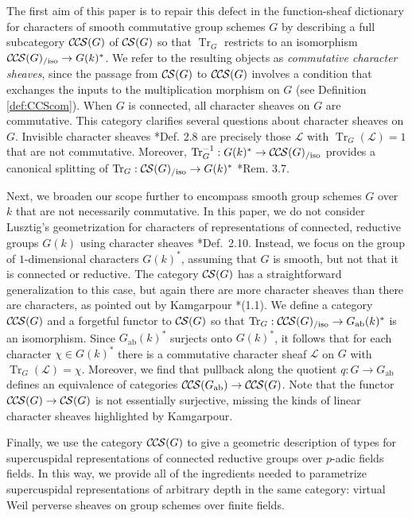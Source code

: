 \documentclass[10pt]{amsart}
\theoremstyle{plain}
\theoremstyle{definition}
\newcommand{\Fq}{k}
\newcommand{\ab}{_{\operatorname{ab}}}
\newcommand{\TrFrob}[1]{\operatorname{Tr}_{#1}}
\newcommand{\cs}[1]{{\mathcal{#1}}}
\newcommand{\CS}{{\mathcal{C\hskip-0.8pt S}}}
\newcommand{\CCS}{{\mathcal{C\hskip-.8pt C\hskip-0.8pt S}}}
\newcommand{\CSiso}[1]{\CS(#1)_{/\text{iso}}}
\newcommand{\CCSiso}[1]{\CCS(#1)_{/\text{iso}}}
\begin{document}
The first aim of this paper is to repair this defect in the function-sheaf dictionary for characters of smooth commutative group schemes $G$ by describing a full subcategory $\CCS(G)$ of $\CS(G)$ so that $\TrFrob{G}$ restricts to an isomorphism $\CCSiso{G} \to G(k)^*$.
We refer to the resulting objects as \emph{commutative character sheaves}, since the passage from $\CS(G)$ to $\CCS(G)$ involves a condition that exchanges the inputs to the multiplication morphism on $G$ (see Definition \ref{def:CCScom}).  
When $G$ is connected, all character sheaves on $G$ are commutative.
This category clarifies several questions about character sheaves on $G$.  Invisible character sheaves \cite{cunningham-roe:13a}*{Def. 2.8} are precisely those $\cs{L}$ with $\TrFrob{G}(\cs{L}) = 1$ that are not commutative.  Moreover, $\TrFrob{G}^{-1} : G(k)^* \to \CCSiso{G}$ provides a canonical splitting of $\TrFrob{G} : \CSiso{G} \to G(k)^*$ \cite{cunningham-roe:13a}*{Rem. 3.7}.

Next, we broaden our scope further to encompass smooth group schemes $G$ over $\Fq$ that are not necessarily commutative.
In this paper, we do not consider Lusztig's geometrization for characters of representations of connected, reductive groups $G(k)$
using character sheaves \cite{lusztig:85a}*{Def.~2.10}.  Instead, we focus on the group of $1$-dimensional characters
$G(k)^*$, assuming that $G$ is smooth, but not that it is connected or reductive.
The category $\CS(G)$ has a straightforward generalization to this case, but again
there are more character sheaves than there are characters, as pointed out by Kamgarpour \cite{kamgarpour:09a}*{(1.1)}.
We define a category $\CCS(G)$ and a forgetful functor to $\CS(G)$ so that $\TrFrob{G} : \CCSiso{G} \to G\ab(k)^*$
is an isomorphism.  
Since $G\ab(k)^*$ surjects onto $G(k)^*$, it follows that for each character $\chi \in G(k)^*$ there is a commutative
character sheaf $\cs{L}$ on $G$ with $\TrFrob{G}(\cs{L}) = \chi$. Moreover, we find that pullback along the quotient $q : G \to G\ab$
defines an equivalence of categories $\CCS(G\ab) \to \CCS(G)$.  Note that the functor $\CCS(G) \to \CS(G)$ is not
essentially surjective, missing the kinds of linear character sheaves highlighted by Kamgarpour.

Finally, we use the category $\CCS(G)$ to give a geometric description of types for supercuspidal representations of connected reductive groups over $p$-adic fields fields.
In this way, we provide all of the ingredients needed to parametrize supercuspidal representations of arbitrary depth in the same category:
virtual Weil perverse sheaves on group schemes over finite fields. 
\end{document}
